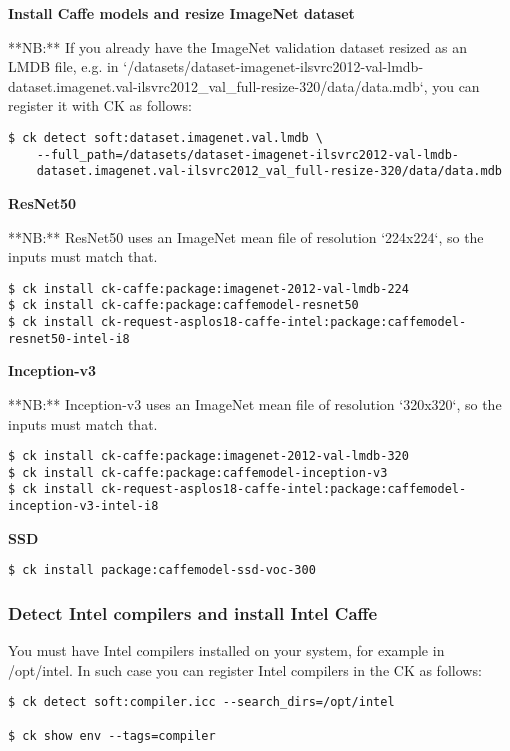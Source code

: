 \documentclass[sigplan]{acmart}
\begin{document}
\textbf{Install Caffe models and resize ImageNet dataset}

**NB:** If you already have the ImageNet validation dataset resized as an LMDB file, 
e.g. in `/datasets/dataset-imagenet-ilsvrc2012-val-lmdb-dataset.imagenet.val-ilsvrc2012\_val\_full-resize-320/data/data.mdb`, 
you can register it with CK as follows:

\begin{verbatim}
$ ck detect soft:dataset.imagenet.val.lmdb \
    --full_path=/datasets/dataset-imagenet-ilsvrc2012-val-lmdb-
    dataset.imagenet.val-ilsvrc2012_val_full-resize-320/data/data.mdb
\end{verbatim}

\textbf{ResNet50}

**NB:** ResNet50 uses an ImageNet mean file of resolution `224x224`, so the inputs must match that.

\begin{verbatim}
$ ck install ck-caffe:package:imagenet-2012-val-lmdb-224
$ ck install ck-caffe:package:caffemodel-resnet50
$ ck install ck-request-asplos18-caffe-intel:package:caffemodel-resnet50-intel-i8
\end{verbatim}

\textbf{Inception-v3}

**NB:** Inception-v3 uses an ImageNet mean file of resolution `320x320`, so the inputs must match that.

\begin{verbatim}
$ ck install ck-caffe:package:imagenet-2012-val-lmdb-320
$ ck install ck-caffe:package:caffemodel-inception-v3
$ ck install ck-request-asplos18-caffe-intel:package:caffemodel-inception-v3-intel-i8
\end{verbatim}

\textbf{SSD}

\begin{verbatim}
$ ck install package:caffemodel-ssd-voc-300
\end{verbatim}

\subsubsection{Detect Intel compilers and install Intel Caffe}

You must have Intel compilers installed on your system, for example in /opt/intel.
In such case you can register Intel compilers in the CK as follows:
\begin{verbatim}
$ ck detect soft:compiler.icc --search_dirs=/opt/intel

$ ck show env --tags=compiler
\end{verbatim}
\end{document}
